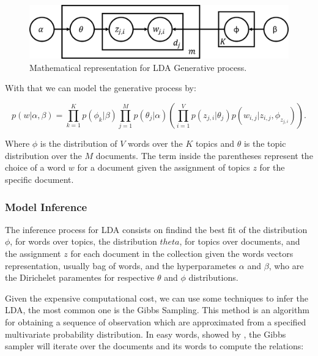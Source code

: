 	\begin{figure}[h!]
		\centering
		\includegraphics[width=0.7\linewidth]{01.Chapters/02.Background/generative-probs}
		\caption{Mathematical representation for LDA Generative process.}
		\label{fig:generative-probs}
	\end{figure}
	
	With that we can model the generative process by: 
	
	\begin{equation}
		\label{eq:generative-lda}
		p(w|\alpha, \beta) = \prod_{k=1}^{K} p(\phi_{k}|\beta) \prod_{j=1}^{M} p(\theta_{j}|\alpha) \left( \prod_{i=1}^{V}p(z_{j,i}|\theta_{j}) p(w_{i,j}|z_{i,j},\phi_{z_{j,i}})  \right) \text{.}
	\end{equation}

	Where $\phi$ is the distribution of $V$ words over the $K$ topics and $\theta$ is the topic distribution over the $M$ documents. The term inside the parentheses represent the choice of a word $w$ for a document given the assignment of topics $z$ for the specific document.
	
	\subsubsection{Model Inference}
	
	The inference process for LDA consists on findind the best fit of the distribution $\phi$, for words over topics, the distribution $theta$, for topics over documents, and the assignment $z$ for each document in the collection given the words vectors representation, usually bag of words, and the hyperparametes $\alpha$ and $\beta$, who are the Dirichelet paramentes for respective $\theta$ and $\phi$ distributions.
	
	Given the expensive computational cost, we can use some techniques to infer the LDA, the most common one is the Gibbs Sampling. This method is an algorithm for obtaining a sequence of observation which are approximated from a specified multivariate probability distribution. In easy words, showed by , the Gibbs sampler will iterate over the documents and its words to compute the relations:


